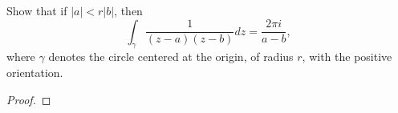\documentclass[../hw1]{subfiles}
\begin{document}
\begin{problem}
Show that if $|a|<r|b|$, then  \[
	\int_{\gamma}\frac{1}{(z-a)(z-b)}dz = \frac{2\pi i}{a-b}
	,\] where $\gamma$ denotes the circle centered at the origin, of radius $r$, with the positive orientation.
\end{problem}
\begin{proof}

\end{proof}
\end{document}

